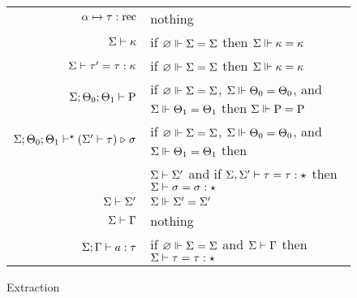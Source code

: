 \documentclass{article}
\begin{document}
\begin{figure}
\begin{center}
\begin{tabular}{r@{$\;\;\mapsto\;\;$}l}
$\alpha \mapsto \tau : \mathrm{rec}$ & nothing \\
$\Sigma \vdash \kappa$ & if $\varnothing \Vdash \Sigma = \Sigma$ then $\Sigma \Vdash \kappa = \kappa$ \\
$\Sigma \vdash \tau' = \tau : \kappa$ & if $\varnothing \Vdash \Sigma = \Sigma$ then $\Sigma \Vdash \kappa = \kappa$ \\
$\Sigma ; \Theta_0 ; \Theta_1 \vdash \mathrm{P}$ &
  if $\varnothing \Vdash \Sigma = \Sigma$, $\Sigma \Vdash \Theta_0 = \Theta_0$, and $\Sigma \Vdash \Theta_1 =
  \Theta_1$ then $\Sigma \Vdash \mathrm{P} = \mathrm{P}$ \\
$\Sigma ; \Theta_0 ; \Theta_1 \vdash^\star (\Sigma' \vdash \tau) \mathrel\triangleright \sigma$ &
  if $\varnothing \Vdash \Sigma = \Sigma$, $\Sigma \Vdash \Theta_0 = \Theta_0$, and $\Sigma \Vdash \Theta_1 = \Theta_1$ then \\
  & $\Sigma \vdash \Sigma'$ and
  if $\Sigma, \Sigma' \vdash \tau = \tau : \star$ then $\Sigma \vdash \sigma = \sigma : \star$ \\
$\Sigma \vdash \Sigma'$ & $\Sigma \Vdash \Sigma' = \Sigma'$ \\
$\Sigma \vdash \Gamma$ & nothing \\
$\Sigma ; \Gamma \vdash a : \tau$ & if $\varnothing \Vdash \Sigma = \Sigma$ and $\Sigma \vdash \Gamma$
  then $\Sigma \vdash \tau = \tau : \star$ \\
\end{tabular}
\end{center}
\caption{Extraction}
\label{fig:extraction}
\end{figure}
\end{document}
